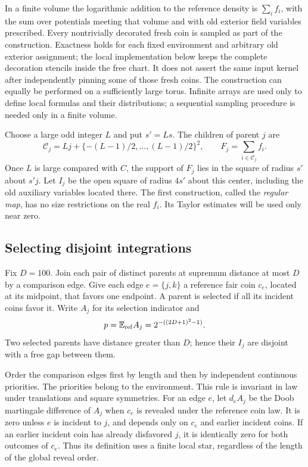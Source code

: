 In a finite volume the logarithmic addition to the reference density is
$\sum_i f_i$, with the sum over potentials meeting that volume and with
old exterior field variables prescribed.  Every nontrivially decorated
fresh coin is sampled as part of the construction.  Exactness holds for
each fixed environment and arbitrary old exterior assignment; the local
implementation below keeps the complete decoration stencils inside the
free chart.  It does not assert the same input kernel after independently
pinning some of those fresh coins.  The construction can equally be
performed on a sufficiently large torus.  Infinite arrays are used only
to define local formulas and their distributions; a sequential sampling
procedure is needed only in a finite volume.

Choose a large odd integer $L$ and put $s'=Ls$.  The children of parent
$j$ are
\[
 \mathcal C_j=Lj+\{-(L-1)/2,\ldots,(L-1)/2\}^2,
 \qquad F_j=\sum_{i\in\mathcal C_j}f_i.
\]
Once $L$ is large compared with $C$, the support of $F_j$ lies in the
square of radius $s'$ about $s'j$.  Let $I_j$ be the open square of radius
$4s'$ about this center, including the old auxiliary variables located
there.  The first construction, called the \emph{regular map}, has no
size restrictions on the real $f_i$.  Its Taylor estimates will be used
only near zero.

\subsection{Selecting disjoint integrations}

Fix $D=100$.  Join each pair of distinct parents at supremum distance at
most $D$ by a comparison edge.  Give each edge $e=\{j,k\}$ a reference fair
coin $c_e$, located at its midpoint, that favors one endpoint.  A parent
is selected if all its incident coins favor it.  Write $A_j$ for its
selection indicator and
\[
 p=\mathbb E_{\mathrm{ref}}A_j=2^{-((2D+1)^2-1)}.
\]
Two selected parents have distance greater than $D$; hence their $I_j$
are disjoint with a free gap between them.

Order the comparison edges first by length and then by independent
continuous priorities.  The priorities belong to the environment.  This
rule is invariant in law under translations and square symmetries.
For an edge $e$, let $d_eA_j$ be the Doob martingale difference of $A_j$
when $c_e$ is revealed under the reference coin law.  It is zero unless
$e$ is incident to $j$, and depends only on $c_e$ and earlier incident
coins.  If an earlier incident coin has already disfavored $j$, it is
identically zero for both outcomes of $c_e$.  Thus its definition uses a
finite local star, regardless of the length of the global reveal order.

